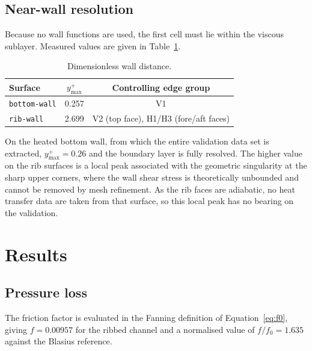 \documentclass[11pt,a4paper]{article}
\begin{document}
\subsection{Near-wall resolution}

Because no wall functions are used, the first cell must lie within the
viscous sublayer. Measured values are given in Table~\ref{tab:yplus}.

\begin{table}[htbp]
\centering
\caption{Dimensionless wall distance.}
\label{tab:yplus}
\begin{tabular}{lcc}
\toprule
Surface & $y^{+}_{\max}$ & Controlling edge group \\
\midrule
\texttt{bottom-wall} & 0.257 & V1 \\
\texttt{rib-wall}    & 2.699 & V2 (top face), H1/H3 (fore/aft faces) \\
\bottomrule
\end{tabular}
\end{table}

On the heated bottom wall, from which the entire validation data set is
extracted, $y^{+}_{\max} = 0.26$ and the boundary layer is fully resolved.
The higher value on the rib surfaces is a local peak associated with the
geometric singularity at the sharp upper corners, where the wall shear
stress is theoretically unbounded and cannot be removed by mesh refinement.
As the rib faces are adiabatic, no heat transfer data are taken from that
surface, so this local peak has no bearing on the validation.

\section{Results}

\subsection{Pressure loss}

The friction factor is evaluated in the Fanning definition of
Equation~\eqref{eq:f0}, giving $f = 0.00957$ for the ribbed channel and a
normalised value of $f/f_{0} = 1.635$ against the Blasius reference.
\end{document}
